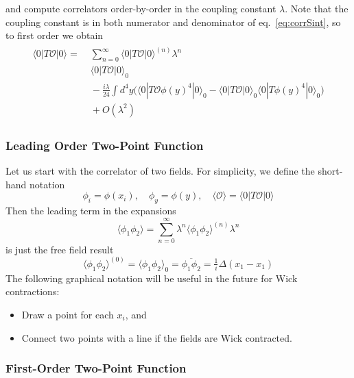 \documentclass[12pt]{article}
\begin{document}
and compute correlators order-by-order in the coupling constant
$\lambda$. Note that the coupling constant is in both numerator and
denominator of eq.~\eqref{eq:corrSint}, so to first order we obtain
\begin{multline}
  \begin{split}
    \langle 0|T\mathcal{O}|0\rangle = &\;
    \sum_{n=0}^\infty \langle 0|T\mathcal{O}|0\rangle^{(n)} \lambda^n
    \\ &\;
    \langle 0|T\mathcal{O}|0\rangle_0 
    \\ &\;
    - \frac{i\lambda}{24} \int d^4y \Big(
    \langle 0|T\mathcal{O} \phi(y)^4 |0\rangle_0 - 
    \langle 0|T\mathcal{O} |0\rangle_0 
    \langle 0|T \phi(y)^4 |0\rangle_0 
    \Big)
    \\ &\;
    + O(\lambda^2)
  \end{split}
\end{multline}


\subsubsection{Leading Order Two-Point Function}

Let us start with the correlator of two fields. For simplicity, we
define the short-hand notation
\begin{equation}
  \phi_i = \phi(x_i)
  ,\quad
  \phi_y = \phi(y)
  ,\quad
  \langle \mathcal{O} \rangle = \langle 0|T \mathcal{O} |0\rangle
\end{equation}
Then the leading term in the expansions
\begin{equation}
  \langle \phi_1 \phi_2 \rangle = 
  \sum_{n=0}^\infty \lambda^n \langle \phi_1 \phi_2 \rangle^{(n)}
  \lambda^n
\end{equation}
is just the free field result
\begin{equation}
  \langle \phi_1 \phi_2 \rangle^{(0)}
  = 
  \langle \phi_1 \phi_2 \rangle_0
  = 
  \overline{\phi_1 \phi_2}
  = 
  \tfrac{1}{i} \Delta(x_1 - x_1)
\end{equation}
The following graphical notation will be useful in the future for Wick
contractions:
\begin{itemize}
\item Draw a point for each $x_i$, and
\item Connect two points with a line if the fields are Wick contracted.
\end{itemize}


\subsubsection{First-Order Two-Point Function}
\end{document}
